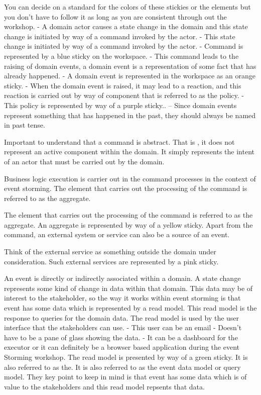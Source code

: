 \documentclass[a4paper, 11pt]{book}
\begin{document}
    You can decide on a standard for the colors of these stickies or the elements but you don't have to follow it as long as you are consistent through out the workshop.
    - A domain actor causes a state change in the domain and this state change is initiated by way of a command invoked by the actor.
    - This state change is initiated by way of a command invoked by the actor.
    - Command is represented by a blue sticky on the workspace.
    - This command leads to the raising of domain events, a domain event is a representation of some fact that has already happened.
    - A domain event is represented in the workspace as an orange sticky.
    - When the domain event is raised, it may lead to a reaction, and this reaction is carried out by way of component that is referred to as the policy.
    - This policy is represented by way of a purple sticky..
    -- Since domain events represent something that has happened in the past, they should always be named in past tense.

    Important to understand that a command is abstract.
    That is , it does not represent an active component within the domain.
    It simply represents the intent of an actor that must be carried out by the domain.

    Business logic execution is carrier out in the command processes in the context of event storming.
    The element that carries out the processing of the command is referred to as the aggregate.

    The element that carries out the processing of the command is referred to as the aggregate.
    An aggregate is represented by way of a yellow sticky.
    Apart from the command, an external system or service can also be a source of an event.

    Think of the external service as something outside the domain under consideration.
    Such external services are represented by a pink sticky.

    An event is directly or indirectly associated within a domain.
    A state change represents some kind of change in data within that domain.
    This data may be of interest to the stakeholder, so the way it works within event storming is that event has some data which is represented by a read model.
    This read model is the response to queries for the domain data.
    The read model is used by the user interface that the stakeholders can use.
    - This user can be an email
    - Doesn't have to be a pane of glass showing the data.
    - It can be a dashboard for the executor or it can definitely be a browser based application during the event Storming workshop.
    The read model is presented by way of a green sticky.
    It is also referred to as the.
    It is also referred to as the event data model or query model.
    They key point to keep in mind is that event has some data which is of value to the stakeholders and this read model repsents that data.
\end{document}
